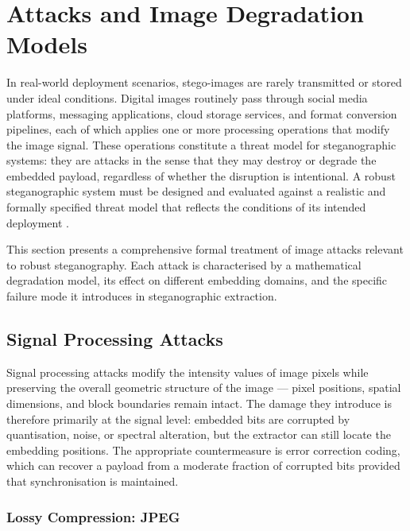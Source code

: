 \documentclass[12pt,a4paper,oneside]{report}
\begin{document}
	\section{Attacks and Image Degradation Models}
	\label{sec:attacks}
	
	In real-world deployment scenarios, stego-images are rarely transmitted or stored under ideal
	conditions. Digital images routinely pass through social media platforms, messaging applications,
	cloud storage services, and format conversion pipelines, each of which applies one or more
	processing operations that modify the image signal. These operations constitute a threat model for
	steganographic systems: they are attacks in the sense that they may destroy or degrade the
	embedded payload, regardless of whether the disruption is intentional. A robust steganographic
	system must be designed and evaluated against a realistic and formally specified threat model that
	reflects the conditions of its intended deployment \cite{petitcolas1999information,
		cox2007digital}.
	
	This section presents a comprehensive formal treatment of image attacks relevant to robust
	steganography. Each attack is characterised by a mathematical degradation model, its effect on
	different embedding domains, and the specific failure mode it introduces in steganographic
	extraction.
	
	\subsection{Signal Processing Attacks}
	\label{subsec:signal_attacks}
	
	Signal processing attacks modify the intensity values of image pixels while preserving the overall
	geometric structure of the image — pixel positions, spatial dimensions, and block boundaries remain
	intact. The damage they introduce is therefore primarily at the signal level: embedded bits are
	corrupted by quantisation, noise, or spectral alteration, but the extractor can still locate the
	embedding positions. The appropriate countermeasure is error correction coding, which can recover
	a payload from a moderate fraction of corrupted bits provided that synchronisation is maintained.
	
	\subsubsection{Lossy Compression: JPEG}
	
\end{document}
